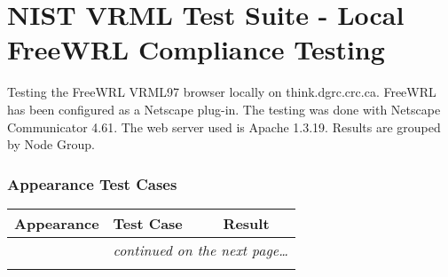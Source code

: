 \documentclass[12pt,letterpaper]{article}
\newcounter{testCaseCtr}
\newcommand{\resetTestCase}{\setcounter{testCaseCtr}{1}}
\begin{document}
\part*{NIST VRML Test Suite - Local FreeWRL Compliance Testing}

Testing the FreeWRL VRML97 browser locally on think.dgrc.crc.ca.
FreeWRL has been configured as a Netscape plug-in.
The testing was done with Netscape Communicator 4.61.
The web server used is Apache 1.3.19.
Results are grouped by Node Group.

\section{Appearance Test Cases}
\resetTestCase

\begin{center}
\setlongtables
\begin{longtable}{|l|l|l|}
\hline
\textbf{Appearance} & \textbf{Test Case} & \textbf{Result} \\\hline\hline
\endhead
 & \multicolumn{2}{|r|}{\textsl{continued on the next page\ldots}} \\\hline
\endfoot\hline
\endlastfoot


\end{longtable}
\end{center}
\end{document}
